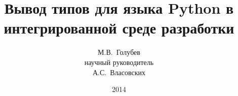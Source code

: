 \documentclass{beamer}
\title[Вывод типов в Python]{ Вывод типов для языка Python в интегрированной среде разработки }
\author[М.В.~Голубев]{%
  М.В.~Голубев \\ \vspace{.10cm} 
  научный руководитель \\ \vspace{.10cm} 
  А.С.~Власовских
}
\institute[ИИТУ]{
  Институт информационных технологий и управления \\
  Кафедра компьютерных систем и программных технологий
}
\date{2014}
\begin{document}
\frame{\titlepage}
\end{document}

